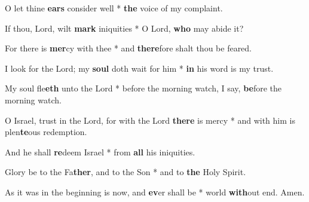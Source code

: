 \begin{multicols}{2}
	O let thine \textbf{ears} consider well * \textbf{the} voice of my complaint.
	
	If thou, Lord, wilt \textbf{mark} iniquities * O Lord, \textbf{who} may abide it?
	
	For there is \textbf{mer}cy with thee * and \textbf{there}fore shalt thou be feared.
	
	I look for the Lord; my \textbf{soul} doth wait for him * \textbf{in} his word is my trust.
	
	My soul fle\textbf{eth} unto the Lord * before the morning watch, I say, \textbf{be}fore the morning watch.
	
	O Israel, trust in the Lord, for with the Lord \textbf{there} is mercy * and with him is plen\textbf{te}ous redemption.
	
	And he shall \textbf{re}deem Israel * from \textbf{all} his iniquities.
	
	Glory be to the Fa\textbf{ther}, and to the Son * and to \textbf{the} Holy Spirit.
	
	As it was in the beginning is now, and \textbf{ev}er shall be * world \textbf{with}out end. Amen.
\end{multicols}